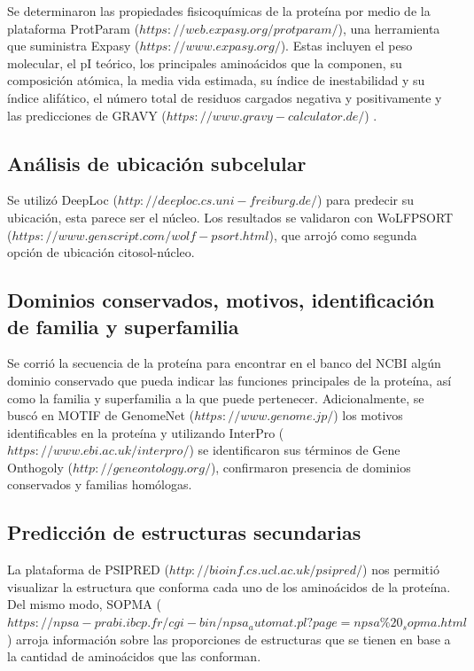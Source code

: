 \documentclass[journal,transmag]{IEEEtran}
\begin{document}
Se determinaron las propiedades fisicoquímicas de la proteína por medio de la plataforma ProtParam ($https://web.expasy.org/protparam/$), una herramienta que suministra Expasy ($https://www.expasy.org/$). Estas incluyen el peso molecular, el pI teórico, los principales aminoácidos que la componen, su composición atómica, la media vida estimada, su índice de inestabilidad y su índice alifático, el número total de residuos cargados negativa y positivamente y las predicciones de GRAVY ($https://www.gravy-calculator.de/$) . 


\subsection{\textbf{ Análisis de ubicación subcelular}}
Se utilizó DeepLoc ($http://deeploc.cs.uni-freiburg.de/$) para predecir su ubicación, esta parece ser el núcleo. Los resultados se validaron con WoLFPSORT ($https://www.genscript.com/wolf-psort.html$), que arrojó como segunda opción de ubicación citosol-núcleo. 

\subsection{\textbf{ Dominios conservados, motivos, identificación de familia y superfamilia}}

Se corrió la secuencia de la proteína para encontrar en el banco del NCBI algún dominio conservado que pueda indicar las funciones principales de la proteína, así como la familia y superfamilia a la que puede pertenecer. Adicionalmente, se buscó en MOTIF de GenomeNet ($https://www.genome.jp/$) los motivos identificables en la proteína y utilizando InterPro ($https://www.ebi.ac.uk/interpro/$) se identificaron sus términos de Gene Onthogoly ($http://geneontology.org/$), confirmaron presencia de dominios conservados y familias homólogas. 

\subsection{\textbf{ Predicción de estructuras secundarias}}

La plataforma de PSIPRED ($http://bioinf.cs.ucl.ac.uk/psipred/$) nos permitió visualizar la estructura que conforma cada uno de los aminoácidos de la proteína. Del mismo modo, SOPMA ($https://npsa-prabi.ibcp.fr/cgi-bin/npsa_automat.pl?page=npsa\%20_sopma.html$) arroja información sobre las proporciones de estructuras que se tienen en base a la cantidad de aminoácidos que las conforman. 
\end{document}
